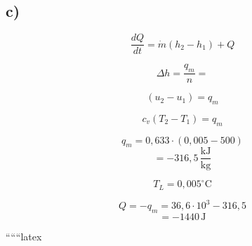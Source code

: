 

\subsection*{c)}

\[ \frac{dQ}{dt} = \dot{m} (h_2 - h_1) + Q \]

\[ \Delta h = \frac{q_m}{n} = \]

\[ (u_2 - u_1) = q_m \]

\[ c_v (T_2 - T_1) = q_m \]

\[ q_m = 0,633 \cdot (0,005 - 500) \]
\[ = -316,5 \, \frac{\text{kJ}}{\text{kg}} \]

\[ T_L = 0,005^\circ \text{C} \]

\[ Q = -q_m = 36,6 \cdot 10^3 - 316,5 \]
\[ = -1440 \, \text{J} \]

``````latex